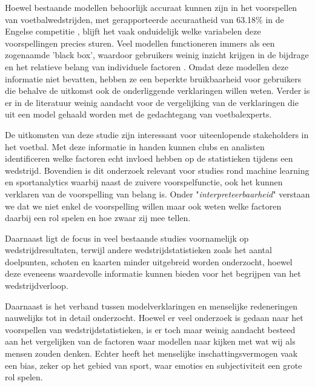 Hoewel bestaande modellen behoorlijk accuraat kunnen zijn in het voorspellen van voetbalwedstrijden, 
met gerapporteerde accuraatheid van 63.18\% in de Engelse competitie \autocite{beal2021football}, 
blijft het vaak onduidelijk welke variabelen deze voorspellingen precies sturen. 
Veel modellen functioneren immers als een zogenaamde 'black box', 
waardoor gebruikers weinig inzicht krijgen in de bijdrage en het relatieve belang van individuele factoren \autocite{guidotti2018survey}.
Omdat deze modellen deze informatie niet bevatten, hebben ze een beperkte bruikbaarheid voor gebruikers die behalve de uitkomst ook de onderliggende verklaringen willen weten.
Verder is er in de literatuur weinig aandacht voor de vergelijking van de verklaringen die uit een model gehaald worden met de gedachtegang van voetbalexperts.

\vspace{5pt}

De uitkomsten van deze studie zijn interessant voor uiteenlopende stakeholders in het voetbal.
Met deze informatie in handen kunnen clubs en analisten identificeren welke factoren echt invloed hebben op de statistieken tijdens een wedstrijd.
Bovendien is dit onderzoek relevant voor studies rond machine learning en sportanalytics
waarbij naast de zuivere voorspelfunctie, ook het kunnen verklaren van de voorspelling van belang is.
Onder "\textit{interpreteerbaarheid}" verstaan we dat we niet enkel de voorspelling willen
maar ook weten welke factoren daarbij een rol spelen en hoe zwaar zij mee tellen.

\vspace{5pt}

Daarnaast ligt de focus in veel bestaande studies voornamelijk op wedstrijdresultaten, terwijl andere wedstrijdstatistieken zoals 
het aantal doelpunten, schoten en kaarten minder uitgebreid worden onderzocht, 
hoewel deze eveneens waardevolle informatie kunnen bieden voor het begrijpen van het wedstrijdverloop.

\vspace{5pt}

Daarnaast is het verband tussen modelverklaringen en menselijke redeneringen nauwelijks tot in detail onderzocht.
Hoewel er veel onderzoek is gedaan naar het voorspellen van wedstrijdstatistieken, is er toch maar weinig aandacht besteed aan het vergelijken van de factoren waar modellen naar kijken met wat wij als mensen zouden denken.
Echter heeft het menselijke inschattingsvermogen vaak een bias, zeker op het gebied van sport, waar emoties en subjectiviteit een grote rol spelen.

